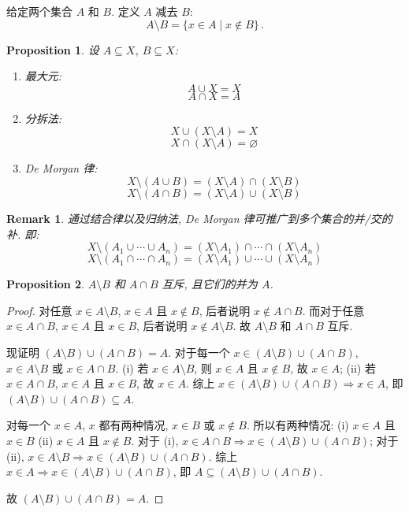 \documentclass[UTF8]{ctexart}
\theoremstyle{mystyle}
\newtheorem{proposition}{Proposition}[section]
\theoremstyle{myremark}
\newtheorem*{remark}{Remark}
\theoremstyle{plain}
\begin{document}
\begin{definition}[\text{差}]
    给定两个集合 $ A $ 和 $ B $. 定义 $ A $ 减去 $ B $:
    \[ A \setminus B = \{x \in A \mid x \not\in B\} \,.\]
\end{definition}

\begin{proposition}
    设 $ A \subseteq X $, $ B \subseteq X $: 
    \begin{enumerate}
        \item 最大元: \[ A \cup X = X \] \[ A \cap X = A \]
        \item 分拆法: \[ X \cup (X \setminus A) = X \] \[ X \cap (X \setminus A) = \varnothing \]
        \item De Morgan 律: \[ X \setminus (A \cup B) = (X \setminus A) \cap (X \setminus B) \] \[ X \setminus (A \cap B) = (X \setminus A) \cup (X \setminus B) \]
    \end{enumerate}
\end{proposition}

\begin{remark}
    通过结合律以及归纳法, De Morgan 律可推广到多个集合的并/交的补. 即: \[ X \setminus (A_1 \cup \cdots \cup A_n) = (X \setminus A_1) \cap \cdots \cap (X \setminus A_n) \] \[ X \setminus (A_1 \cap \cdots \cap A_n) = (X \setminus A_1) \cup \cdots \cup (X \setminus A_n) \]
\end{remark} 
    
\begin{proposition} \label{1.9}
    $ A \setminus B $ 和 $ A \cap B $ 互斥, 且它们的并为 $ A $.
\end{proposition}

\begin{proof}
    对任意 $ x \in A \setminus B $, $ x \in A $ 且 $ x \notin B $, 后者说明 $ x \notin A \cap B $. 而对于任意 $ x \in A \cap B $, $ x \in A $ 且 $ x \in B $, 后者说明 $ x \notin A \setminus B $. 故 $ A \setminus B $ 和 $ A \cap B $ 互斥.

    现证明 $ (A \setminus B) \cup (A \cap B) = A $. 对于每一个 $ x \in (A \setminus B) \cup (A \cap B) $, $ x \in A \setminus B $ 或 $ x \in A \cap B $. (i) 若 $ x \in A \setminus B $, 则 $ x \in A $ 且 $ x \notin B $, 故 $ x \in A $; (ii) 若 $ x \in A \cap B $, $ x \in A $ 且 $ x \in B $, 故 $ x \in A $. 综上 $ x \in (A \setminus B) \cup (A \cap B) \Longrightarrow x \in A $, 即 $ (A \setminus B) \cup (A \cap B) \subseteq A $.

    对每一个 $ x \in A $, $ x $ 都有两种情况, $ x \in B $ 或 $ x \notin B $. 所以有两种情况: (i) $ x \in A $ 且 $ x \in B $ (ii) $ x \in A $ 且 $ x \notin B $. 对于 (i), $ x \in A \cap B \Longrightarrow x \in (A \setminus B) \cup (A \cap B) $; 对于 (ii), $ x \in A \setminus B \Longrightarrow x \in (A \setminus B) \cup (A \cap B) $. 综上 $ x \in A \Longrightarrow x \in (A \setminus B) \cup (A \cap B) $, 即 $ A \subseteq (A \setminus B) \cup (A \cap B) $.

    故 $ (A \setminus B) \cup (A \cap B) = A $.
\end{proof}
\end{document}
